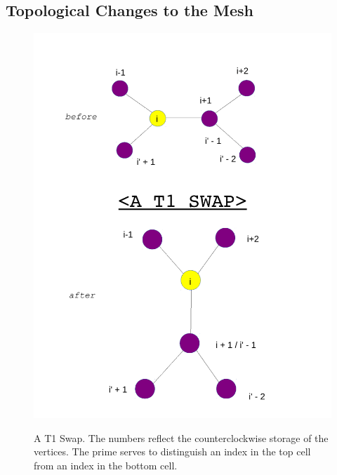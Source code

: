 \subsection{Topological Changes to the Mesh}
\begin{figure}{}
    \centering
    \includegraphics[width=\textwidth, height=0.8\textheight, keepaspectratio]{../diagrams/t1.pdf}
    \label{fig:t1}
    \caption[A T1 Swap]{A T1 Swap. The numbers reflect the counterclockwise storage of the vertices. The prime serves to distinguish an index in the top cell from an index in the bottom cell.}
\end{figure}
